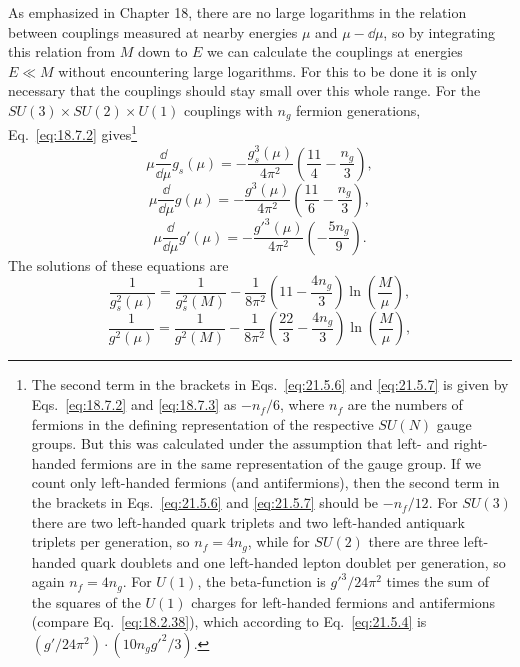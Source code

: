 As emphasized in Chapter 18, there are no large logarithms in the relation between couplings measured at nearby energies $\mu$ and $\mu-\dd\mu$, so by integrating this relation from $M$ down to $E$ we can calculate the couplings at energies $E\ll M$ without encountering large logarithms. For this to be done it is only necessary that the couplings should stay small over this whole range. For the $SU(3)\times SU(2)\times U(1)$ couplings with $n_g$ fermion generations, Eq.~\eqref{eq:18.7.2} gives\footnote{The second term in the brackets in Eqs.~\eqref{eq:21.5.6} and \eqref{eq:21.5.7} is given by Eqs.~\eqref{eq:18.7.2} and \eqref{eq:18.7.3} as $-n_f/6$, where $n_f$ are the numbers of fermions in the defining representation of the respective $SU(N)$ gauge groups. But this was calculated under the assumption that left- and right-handed fermions are in the same representation of the gauge group. If we count only left-handed fermions (and antifermions), then the second term in the brackets in Eqs.~\eqref{eq:21.5.6} and \eqref{eq:21.5.7} should be $-n_f/12$. For $SU(3)$ there are two left-handed quark triplets and two left-handed antiquark triplets per generation, so $n_f=4n_g$, while for $SU(2)$ there are three left-handed quark doublets and one left-handed lepton doublet per generation, so again $n_f=4n_g$. For $U(1)$, the beta-function is $g'^3/24\pi^2$ times the sum of the squares of the $U(1)$ charges for left-handed fermions and antifermions (compare Eq.~\eqref{eq:18.2.38}), which according to Eq.~\eqref{eq:21.5.4} is $(g'/24\pi^2)\cdot(10n_gg'^2/3)$.}
\begin{equation}
\mu\frac{\dd}{\dd\mu}g_s(\mu)
=-\frac{g_s^3(\mu)}{4\pi^2}
\left(\frac{11}{4}-\frac{n_g}{3}\right),
\tag{21.5.6}\label{eq:21.5.6}
\end{equation}
\begin{equation}
\mu\frac{\dd}{\dd\mu}g(\mu)
=-\frac{g^3(\mu)}{4\pi^2}
\left(\frac{11}{6}-\frac{n_g}{3}\right),
\tag{21.5.7}\label{eq:21.5.7}
\end{equation}
\begin{equation}
\mu\frac{\dd}{\dd\mu}g'(\mu)
=-\frac{g'^3(\mu)}{4\pi^2}
\left(-\frac{5n_g}{9}\right).
\tag{21.5.8}\label{eq:21.5.8}
\end{equation}
The solutions of these equations are
\begin{equation}
\frac{1}{g_s^2(\mu)}
=\frac{1}{g_s^2(M)}
-\frac{1}{8\pi^2}
\left(11-\frac{4n_g}{3}\right)
\ln\left(\frac{M}{\mu}\right),
\tag{21.5.9}\label{eq:21.5.9}
\end{equation}
\begin{equation}
\frac{1}{g^2(\mu)}
=\frac{1}{g^2(M)}
-\frac{1}{8\pi^2}
\left(\frac{22}{3}-\frac{4n_g}{3}\right)
\ln\left(\frac{M}{\mu}\right),
\tag{21.5.10}\label{eq:21.5.10}
\end{equation}
